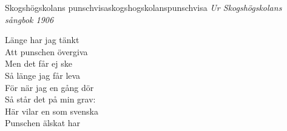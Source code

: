 \begin{song}{Skogshögskolans punschvisa}{skogshogskolanspunschvisa}
\textit{Ur Skogshögskolans sångbok 1906}
\begin{vers}
Länge har jag tänkt \\
Att punschen övergiva\\
Men det får ej ske\\
Så länge jag får leva\\
För när jag en gång dör\\
Så står det på min grav:\\
Här vilar en som svenska \\
Punschen älskat har\\
\end{vers}
\end{song}
